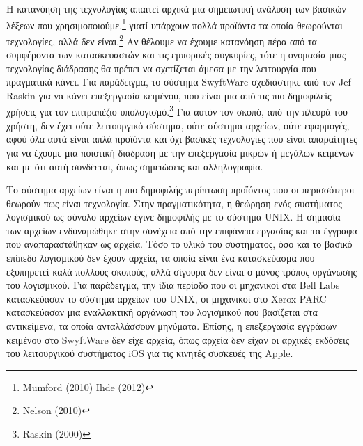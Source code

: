 \documentclass[
]{article}
\begin{document}
Η κατανόηση της τεχνολογίας απαιτεί αρχικά μια σημειωτική ανάλυση των
βασικών λέξεων που χρησιμοποιούμε,\footnote{Mumford (2010) Ihde (2012)}
γιατί υπάρχουν πολλά προϊόντα τα οποία θεωρούνται τεχνολογίες, αλλά δεν
είναι.\footnote{Nelson (2010)} Αν θέλουμε να έχουμε κατανόηση πέρα από
τα συμφέροντα των κατασκευαστών και τις εμπορικές συγκυρίες, τότε η
ονομασία μιας τεχνολογίας διάδρασης θα πρέπει να σχετίζεται άμεσα με την
λειτουργία που πραγματικά κάνει. Για παράδειγμα, το σύστημα SwyftWare
σχεδιάστηκε από τον Jef Raskin για να κάνει επεξεργασία κειμένου, που
είναι μια από τις πιο δημοφιλείς χρήσεις για τον επιτραπέζιο
υπολογισμό.\footnote{Raskin (2000)} Για αυτόν τον σκοπό, από την πλευρά
του χρήστη, δεν έχει ούτε λειτουργικό σύστημα, ούτε σύστημα αρχείων,
ούτε εφαρμογές, αφού όλα αυτά είναι απλά προϊόντα και όχι βασικές
τεχνολογίες που είναι απαραίτητες για να έχουμε μια ποιοτική διάδραση με
την επεξεργασία μικρών ή μεγάλων κειμένων και με ότι αυτή συνδέεται,
όπως σημειώσεις και αλληλογραφία.

Το σύστημα αρχείων είναι η πιο δημοφιλής περίπτωση προϊόντος που οι
περισσότεροι θεωρούν πως είναι τεχνολογία. Στην πραγματικότητα, η
θεώρηση ενός συστήματος λογισμικού ως σύνολο αρχείων έγινε δημοφιλής με
το σύστημα UNIX. Η σημασία των αρχείων ενδυναμώθηκε στην συνέχεια από
την επιφάνεια εργασίας και τα έγγραφα που αναπαραστάθηκαν ως αρχεία.
Τόσο το υλικό του συστήματος, όσο και το βασικό επίπεδο λογισμικού δεν
έχουν αρχεία, τα οποία είναι ένα κατασκεύασμα που εξυπηρετεί καλά
πολλούς σκοπούς, αλλά σίγουρα δεν είναι ο μόνος τρόπος οργάνωσης του
λογισμικού. Για παράδειγμα, την ίδια περίοδο που οι μηχανικοί στα Bell
Labs κατασκεύασαν το σύστημα αρχείων του UNIX, οι μηχανικοί στο Xerox
PARC κατασκεύασαν μια εναλλακτική οργάνωση του λογισμικού που βασίζεται
στα αντικείμενα, τα οποία ανταλλάσσουν μηνύματα. Επίσης, η επεξεργασία
εγγράφων κειμένου στο SwyftWare δεν είχε αρχεία, όπως αρχεία δεν είχαν
οι αρχικές εκδόσεις του λειτουργικού συστήματος iOS για τις κινητές
συσκευές της Apple.
\end{document}
